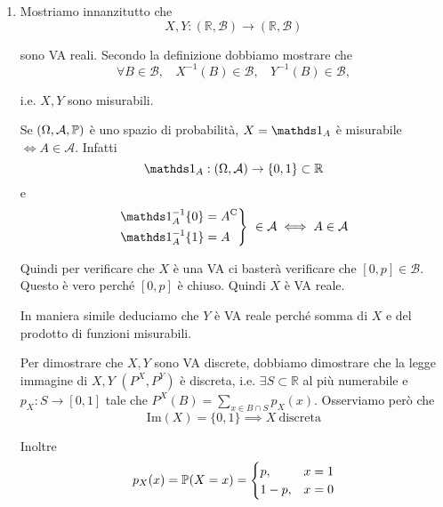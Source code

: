 \ParteSoluzioni






\Soluzione
\begin{enumerate}
\item Mostriamo innanzitutto che\begin{equation*}
X,Y:(\mathbb{R} ,\mathcal{B})\rightarrow (\mathbb{R} ,\mathcal{B})
\end{equation*}

sono VA reali. Secondo la definizione dobbiamo mostrare che\begin{equation*}
\forall B\in \mathcal{B} ,\ \ \ \ X^{-1}( B) \in \mathcal{B} ,\ \ \ \ Y^{-1}( B) \in \mathcal{B} ,
\end{equation*}

i.e. $X,Y$ sono misurabili.\begin{oss}
Se $( \Omega ,\mathcal{A} ,\mathbb{P})$ è uno spazio di probabilità, $X=\Ind_{A}$ è misurabile $\iff A\in \mathcal{A}$. Infatti
\begin{equation*}
\Ind_{A} :( \Omega ,\mathcal{A})\rightarrow \{0,1\} \subset \mathbb{R}
\end{equation*}
e
\begin{equation*}
\begin{drcases}
\Ind_{A}^{-1}\{0\} =A\comp\\
\Ind_{A}^{-1}\{1\} =A
\end{drcases} \ \in \mathcal{A} \iff A\in \mathcal{A}
\end{equation*}
\end{oss}

Quindi per verificare che $X$ è una VA ci basterà verificare che $[ 0,p] \in \mathcal{B}$. Questo è vero perché $[ 0,p]$ è chiuso. Quindi $X$ è VA reale.

In maniera simile deduciamo che $Y$ è VA reale perché somma di $X$ e del prodotto di funzioni misurabili.

Per dimostrare che $X,Y$ sono VA discrete, dobbiamo dimostrare che la legge immagine di $X,Y$ $\left( P^{X} ,P^{Y}\right)$ è discreta, i.e. $\exists S\subset \mathbb{R}$ al più numerabile e $p_{X} :S\rightarrow [ 0,1]$ tale che $P^{X}( B) =\sum\limits _{x\in B\cap S} p_{X}( x)$. Osserviamo però che\begin{equation*}
\mathrm{Im}( X) =\{0,1\} \implies X\ \text{discreta}
\end{equation*}

Inoltre\begin{equation*}
p_{X}( x) =\mathbb{P}( X=x) =\begin{cases}
p, & x=1\\
1-p, & x=0
\end{cases}
\end{equation*}


\end{enumerate}
